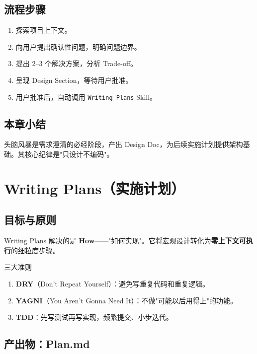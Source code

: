 \documentclass[a4paper]{article}
\begin{document}
\subsection{流程步骤}

\begin{enumerate}
    \item 探索项目上下文。
    \item 向用户提出确认性问题，明确问题边界。
    \item 提出 2--3 个解决方案，分析 Trade-off。
    \item 呈现 Design Section，等待用户批准。
    \item 用户批准后，自动调用 \texttt{Writing Plans} Skill。
\end{enumerate}

\subsection{本章小结}

头脑风暴是需求澄清的必经阶段，产出 Design Doc，为后续实施计划提供架构基础。其核心纪律是"只设计不编码"。


\section{Writing Plans（实施计划）}

\subsection{目标与原则}

Writing Plans 解决的是 \textbf{How}——"如何实现"。它将宏观设计转化为\textbf{零上下文可执行}的细粒度步骤。

\begin{importantbox}{三大准则}
\begin{enumerate}
    \item \textbf{DRY}（Don't Repeat Yourself）：避免写重复代码和重复逻辑。
    \item \textbf{YAGNI}（You Aren't Gonna Need It）：不做"可能以后用得上"的功能。
    \item \textbf{TDD}：先写测试再写实现，频繁提交、小步迭代。
\end{enumerate}
\end{importantbox}

\subsection{产出物：Plan.md}
\end{document}
